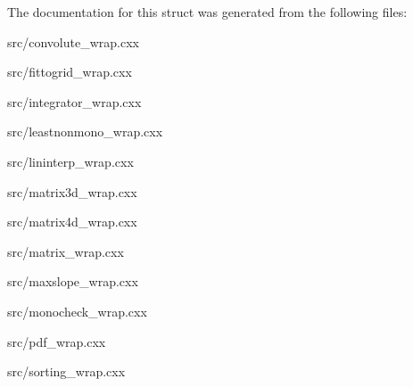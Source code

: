 The documentation for this struct was generated from the following files:\begin{DoxyCompactItemize}
\item 
src/convolute\_\-wrap.cxx\item 
src/fittogrid\_\-wrap.cxx\item 
src/integrator\_\-wrap.cxx\item 
src/leastnonmono\_\-wrap.cxx\item 
src/lininterp\_\-wrap.cxx\item 
src/matrix3d\_\-wrap.cxx\item 
src/matrix4d\_\-wrap.cxx\item 
src/matrix\_\-wrap.cxx\item 
src/maxslope\_\-wrap.cxx\item 
src/monocheck\_\-wrap.cxx\item 
src/pdf\_\-wrap.cxx\item 
src/sorting\_\-wrap.cxx\end{DoxyCompactItemize}
